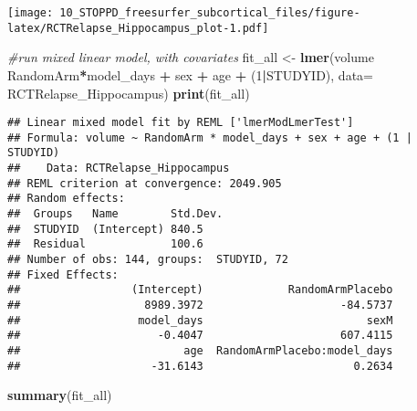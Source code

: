 \documentclass[]{article}
\newenvironment{Shaded}{\begin{snugshade}}{\end{snugshade}}
\newcommand{\KeywordTok}[1]{\textcolor[rgb]{0.13,0.29,0.53}{\textbf{#1}}}
\newcommand{\DataTypeTok}[1]{\textcolor[rgb]{0.13,0.29,0.53}{#1}}
\newcommand{\DecValTok}[1]{\textcolor[rgb]{0.00,0.00,0.81}{#1}}
\newcommand{\StringTok}[1]{\textcolor[rgb]{0.31,0.60,0.02}{#1}}
\newcommand{\CommentTok}[1]{\textcolor[rgb]{0.56,0.35,0.01}{\textit{#1}}}
\newcommand{\OperatorTok}[1]{\textcolor[rgb]{0.81,0.36,0.00}{\textbf{#1}}}
\newcommand{\NormalTok}[1]{#1}
\theoremstyle{definition}
\theoremstyle{definition}
\theoremstyle{definition}
\theoremstyle{remark}
\begin{document}
\texttt{[image: 10\_STOPPD\_freesurfer\_subcortical\_files/figure-latex/RCTRelapse\_Hippocampus\_plot-1.pdf]}

\begin{Shaded}
\begin{Highlighting}[]
\CommentTok{#run mixed linear model, with covariates}
\NormalTok{  fit_all <-}\StringTok{ }\KeywordTok{lmer}\NormalTok{(volume }\OperatorTok{~}\StringTok{ }\NormalTok{RandomArm}\OperatorTok{*}\NormalTok{model_days }\OperatorTok{+}\StringTok{ }\NormalTok{sex }\OperatorTok{+}\StringTok{ }\NormalTok{age }\OperatorTok{+}\StringTok{ }\NormalTok{(}\DecValTok{1}\OperatorTok{|}\NormalTok{STUDYID), }\DataTypeTok{data=}\NormalTok{ RCTRelapse_Hippocampus)}
  \KeywordTok{print}\NormalTok{(fit_all)}
\end{Highlighting}
\end{Shaded}

\begin{verbatim}
## Linear mixed model fit by REML ['lmerModLmerTest']
## Formula: volume ~ RandomArm * model_days + sex + age + (1 | STUDYID)
##    Data: RCTRelapse_Hippocampus
## REML criterion at convergence: 2049.905
## Random effects:
##  Groups   Name        Std.Dev.
##  STUDYID  (Intercept) 840.5   
##  Residual             100.6   
## Number of obs: 144, groups:  STUDYID, 72
## Fixed Effects:
##                 (Intercept)             RandomArmPlacebo  
##                   8989.3972                     -84.5737  
##                  model_days                         sexM  
##                     -0.4047                     607.4115  
##                         age  RandomArmPlacebo:model_days  
##                    -31.6143                       0.2634
\end{verbatim}

\begin{Shaded}
\begin{Highlighting}[]
  \KeywordTok{summary}\NormalTok{(fit_all)}
\end{Highlighting}
\end{Shaded}
\end{document}
